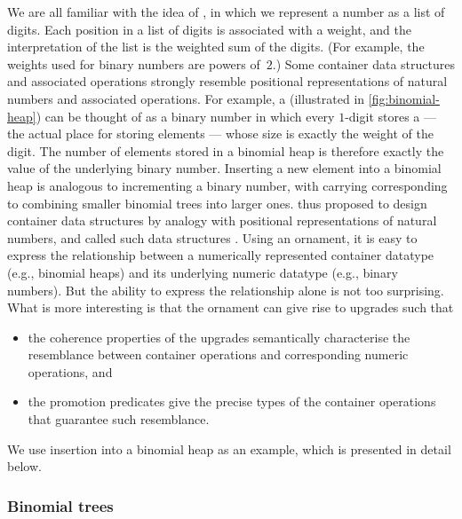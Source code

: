 We are all familiar with the idea of , in which we represent a number as a list of digits.
Each position in a list of digits is associated with a weight, and the interpretation of the list is the weighted sum of the digits.
(For example, the weights used for binary numbers are powers of~$2$.)
Some container data structures and associated operations strongly resemble positional representations of natural numbers and associated operations.
For example, a  (illustrated in \autoref{fig:binomial-heap}) can be thought of as a binary number in which every $1$-digit stores a  --- the actual place for storing elements --- whose size is exactly the weight of the digit.
The number of elements stored in a binomial heap is therefore exactly the value of the underlying binary number.
Inserting a new element into a binomial heap is analogous to incrementing a binary number, with carrying corresponding to combining smaller binomial trees into larger ones.
\citeauthor{Okasaki-data-structures} thus proposed to design container data structures by analogy with positional representations of natural numbers, and called such data structures .
Using an ornament, it is easy to express the relationship between a numerically represented container datatype (e.g., binomial heaps) and its underlying numeric datatype (e.g., binary numbers).
But the ability to express the relationship alone is not too surprising.
What is more interesting is that the ornament can give rise to upgrades such that
\begin{itemize}
\item the coherence properties of the upgrades semantically characterise the resemblance between container operations and corresponding numeric operations, and
\item the promotion predicates give the precise types of the container operations that guarantee such resemblance.
\end{itemize}
We use insertion into a binomial heap as an example, which is presented in detail below.

\subsubsection{Binomial trees}

